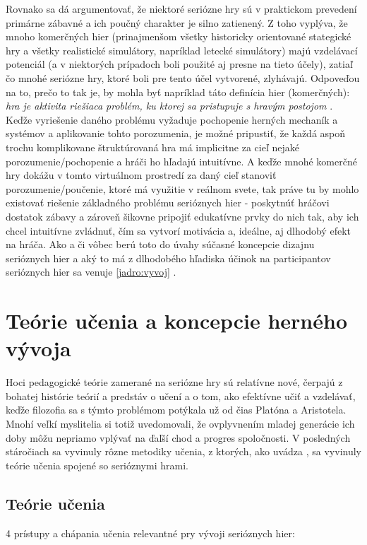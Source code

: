 \documentclass[10pt,twoside,slovak,a4paper]{article}
\begin{document}
Rovnako sa dá argumentovať, že niektoré seriózne hry sú v praktickom prevedení primárne zábavné a ich poučný charakter je silno zatienený. Z toho vyplýva, že mnoho komerčných hier (prinajmenšom všetky historicky orientované stategické hry a všetky realistické simulátory, napríklad letecké simulátory) majú vzdelávací potenciál (a v niektorých prípadoch boli použité aj presne na tieto účely), zatiaľ čo mnohé seriózne hry, ktoré boli pre tento účel vytvorené, zlyhávajú. Odpoveďou na to, prečo to tak je, by mohla byť napríklad táto definícia hier (komerčných): \emph{hra je aktivita riešiaca problém, ku ktorej sa pristupuje s hravým postojom} \cite{schell2008art}. Keďže vyriešenie daného problému vyžaduje pochopenie herných mechaník a systémov a aplikovanie tohto porozumenia, je možné pripustiť, že každá aspoň trochu komplikovane štruktúrovaná hra má implicitne za cieľ nejaké porozumenie/pochopenie a hráči ho hľadajú intuitívne. A keďže mnohé komerčné hry dokážu v tomto virtuálnom prostredí za daný cieľ stanoviť porozumenie/poučenie, ktoré má využitie v reálnom svete, tak práve tu by mohlo existovať riešenie základného problému serióznych hier - poskytnúť hráčovi dostatok zábavy a zároveň šikovne pripojiť edukatívne prvky do nich tak, aby ich chcel intuitívne zvládnuť, čím sa vytvorí motivácia a, ideálne, aj dlhodobý efekt na hráča. Ako a či vôbec berú toto do úvahy súčasné koncepcie dizajnu serióznych hier a aký to má z dlhodobého hľadiska účinok na participantov serióznych hier sa venuje \ref{jadro:vyvoj} .

\section{Teórie učenia a koncepcie herného vývoja} \label{jadro}
Hoci pedagogické teórie zamerané na seriózne hry sú relatívne nové, čerpajú z bohatej histórie teórií a predstáv o učení a o tom, ako efektívne učiť a vzdelávať, keďže filozofia sa s týmto problémom potýkala už od čias Platóna a Aristotela. Mnohí veľkí myslitelia si totiž uvedomovali, že ovplyvnením mladej generácie ich doby môžu nepriamo vplývať na ďaľší chod a progres spoločnosti. V posledných stáročiach sa vyvinuly rôzne metodiky učenia, z ktorých, ako uvádza \cite{natucci2021experience}, sa vyvinuly teórie učenia spojené so serióznymi hrami.

\subsection{Teórie učenia} \label{jadro:teorie}
4 prístupy a chápania učenia relevantné pry vývoji serióznych hier:
\end{document}
